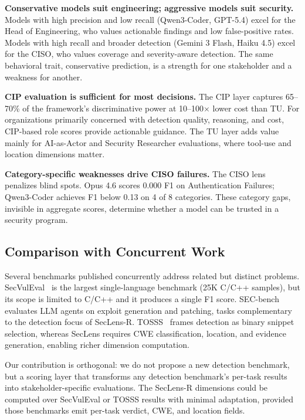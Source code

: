 \documentclass[10pt,twocolumn]{article}
\newcommand{\framework}{SecLens-R\xspace}
\newcommand{\seclens}{SecLens\xspace}
\begin{document}
\textbf{Conservative models suit engineering; aggressive models suit security.} Models with high precision and low recall (Qwen3-Coder, GPT-5.4) excel for the Head of Engineering, who values actionable findings and low false-positive rates. Models with high recall and broader detection (Gemini 3 Flash, Haiku 4.5) excel for the CISO, who values coverage and severity-aware detection. The same behavioral trait, conservative prediction, is a strength for one stakeholder and a weakness for another.

\textbf{CIP evaluation is sufficient for most decisions.} The CIP layer captures 65--70\% of the framework's discriminative power at 10--100$\times$ lower cost than TU. For organizations primarily concerned with detection quality, reasoning, and cost, CIP-based role scores provide actionable guidance. The TU layer adds value mainly for AI-as-Actor and Security Researcher evaluations, where tool-use and location dimensions matter.

\textbf{Category-specific weaknesses drive CISO failures.} The CISO lens penalizes blind spots. Opus 4.6 scores 0.000 F1 on Authentication Failures; Qwen3-Coder achieves F1 below 0.13 on 4 of 8 categories. These category gaps, invisible in aggregate scores, determine whether a model can be trusted in a security program.

\subsection{Comparison with Concurrent Work}

Several benchmarks published concurrently address related but distinct problems. SecVulEval~\citep{lu2025secvuleval} is the largest single-language benchmark (25K C/C++ samples), but its scope is limited to C/C++ and it produces a single F1 score. SEC-bench~\citep{lee2025secbench} evaluates LLM agents on exploit generation and patching, tasks complementary to the detection focus of \framework. TOSSS~\citep{damie2026tosss} frames detection as binary snippet selection, whereas \seclens requires CWE classification, location, and evidence generation, enabling richer dimension computation.

Our contribution is orthogonal: we do not propose a new detection benchmark, but a scoring layer that transforms any detection benchmark's per-task results into stakeholder-specific evaluations. The \framework dimensions could be computed over SecVulEval or TOSSS results with minimal adaptation, provided those benchmarks emit per-task verdict, CWE, and location fields.
\end{document}
